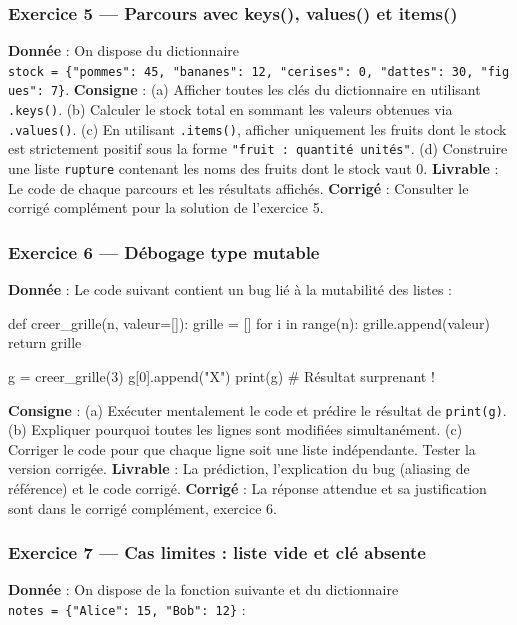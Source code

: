 \subsubsection{Exercice 5 — Parcours avec keys(), values() et items()}

\textbf{Donnée} : On dispose du dictionnaire
\texttt{stock\ =\ \{"pommes":\ 45,\ "bananes":\ 12,\ "cerises":\ 0,\ "dattes":\ 30,\ "figues":\ 7\}}.
\textbf{Consigne} : (a) Afficher toutes les clés du dictionnaire en
utilisant \texttt{.keys()}. (b) Calculer le stock total en sommant les
valeurs obtenues via \texttt{.values()}. (c) En utilisant
\texttt{.items()}, afficher uniquement les fruits dont le stock est
strictement positif sous la forme \texttt{"fruit\ :\ quantité\ unités"}.
(d) Construire une liste \texttt{rupture} contenant les noms des fruits
dont le stock vaut 0. \textbf{Livrable} : Le code de chaque parcours et
les résultats affichés. \textbf{Corrigé} : Consulter le corrigé
complément pour la solution de l'exercice 5.

\subsubsection{Exercice 6 — Débogage type mutable}

\textbf{Donnée} : Le code suivant contient un bug lié à la mutabilité
des listes :

\begin{python}
def creer_grille(n, valeur=[]):
    grille = []
    for i in range(n):
        grille.append(valeur)
    return grille

g = creer_grille(3)
g[0].append("X")
print(g)  # Résultat surprenant !
\end{python}

\textbf{Consigne} : (a) Exécuter mentalement le code et prédire le
résultat de \texttt{print(g)}. (b) Expliquer pourquoi toutes les lignes
sont modifiées simultanément. (c) Corriger le code pour que chaque ligne
soit une liste indépendante. Tester la version corrigée.
\textbf{Livrable} : La prédiction, l'explication du bug (aliasing de
référence) et le code corrigé. \textbf{Corrigé} : La réponse attendue et
sa justification sont dans le corrigé complément, exercice 6.

\subsubsection{Exercice 7 — Cas limites : liste vide et clé absente}

\textbf{Donnée} : On dispose de la fonction suivante et du dictionnaire
\texttt{notes\ =\ \{"Alice":\ 15,\ "Bob":\ 12\}} :

